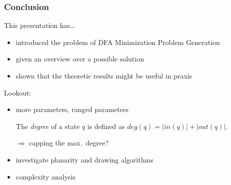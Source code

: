 \documentclass[handout,10pt,usenames,dvipsnames]{beamer}%
\begin{document}
	\begin{frame}
		\frametitle{Conclusion}
		
		This presentation has\ldots
		\begin{itemize}
			\item introduced the problem of DFA Minimization Problem Generation
			\item given an overview over a possible solution
			\item shown that the theoretic results might be useful in praxis
		\end{itemize}\pause
		Lookout:
		\begin{itemize}
			\item more parameters, ranged parameters
			
			The \emph{degree} of a state $q$ is defined as $deg(q) = |in(q)| + |out(q)|$.
			
			$\Rightarrow$ capping the max.\ degree?
			
			\item investigate planarity and drawing algorithms
			\item complexity analysis
		\end{itemize}
	
	\end{frame}

%		
%		
%		
\end{document}
